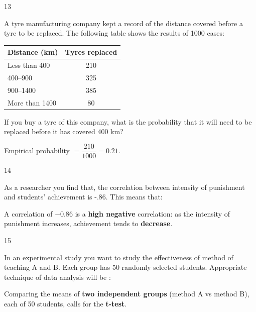 \begin{question}{13}
{A tyre manufacturing company kept a record of the distance covered before a tyre to be replaced. The following table shows the results of 1000 cases:
\begin{center}\small
\begin{tabular}{lc}\toprule Distance (km) & Tyres replaced\\\midrule Less than 400 & 210\\ 400--900 & 325\\ 900--1400 & 385\\ More than 1400 & 80\\\bottomrule\end{tabular}
\end{center}
If you buy a tyre of this company, what is the probability that it will need to be replaced before it has covered 400 km?\par}
\begin{explain}
Empirical probability $=\dfrac{210}{1000}=\mathbf{0.21}$.
\end{explain}
\end{question}

\begin{question}{14}
{As a researcher you find that, the correlation between intensity of punishment and students' achievement is -.86. This means that:\par}
\begin{explain}
A correlation of $-0.86$ is a \textbf{high negative} correlation: as the intensity of punishment increases, achievement tends to \textbf{decrease}.
\end{explain}
\end{question}

\begin{question}{15}
{In an experimental study you want to study the effectiveness of method of teaching A and B. Each group has 50 randomly selected students. Appropriate technique of data analysis will be :\par}
\begin{explain}
Comparing the means of \textbf{two independent groups} (method A vs method B), each of 50 students, calls for the \textbf{t-test}.
\end{explain}
\end{question}

